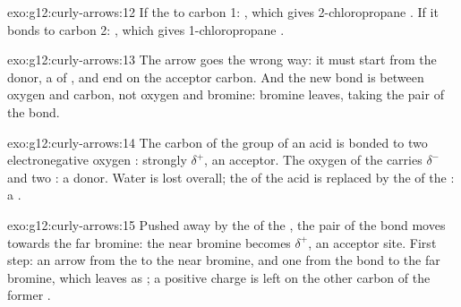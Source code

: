 \begin{solution}{exo:g12:curly-arrows:12}
If the  to carbon 1: , which gives
2-chloropropane . If it bonds to carbon 2:
, which gives 1-chloropropane .
\end{solution}

\begin{solution}{exo:g12:curly-arrows:13}
The arrow goes the wrong way: it must start from the donor, a 
of , and end on the acceptor carbon. And the new bond is between
oxygen and carbon, not oxygen and bromine: bromine leaves, taking the
pair of the  bond.
\end{solution}

\begin{solution}{exo:g12:curly-arrows:14}
The carbon of the  group of an acid is bonded to two
electronegative oxygen : strongly $\delta^+$, an acceptor. The
oxygen of the  carries $\delta^-$ and two : a donor.
Water is lost overall; the  of the acid is replaced by the
 of the : a .
\end{solution}

\begin{solution}{exo:g12:curly-arrows:15}
Pushed away by the  of the , the pair of the
 bond moves towards the far bromine: the near bromine becomes
$\delta^+$, an acceptor site. First step: an arrow from the 
to the near bromine, and one from the  bond to the far
bromine, which leaves as ; a positive charge is left on the
other carbon of the former .
\end{solution}

